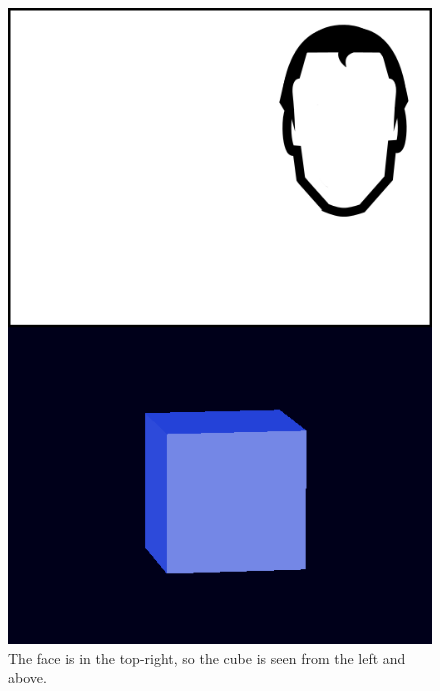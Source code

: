 \begin{figure}
  \centering
  \includegraphics[scale=0.3]{images/head-corner}
  \caption{The face is in the top-right, so the cube is seen
    from the left and above.}
  \label{fig:facecorner}
\end{figure}

